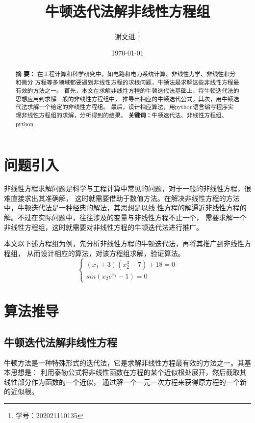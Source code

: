 \documentclass[UTF8,a4paper,12pt]{ctexart}
\title{\textbf{牛顿迭代法解非线性方程组}}
\author{ 谢文进 \thanks{学号：202021110135} }
\date{\today}
\begin{document}
    \maketitle
     	\maketitle %
     	\renewcommand{\abstractname}{}%
     	\begin{abstract}
     		\noindent %
     		{\bf 摘{} 要：}
			 {\small 在工程计算和科学研究中，如电路和电力系统计算、非线性力学、非线性积分和微分
			 方程等多领域都要遇到非线性方程的求根问题，牛顿法是求解这些非线性方程最有效的方法之一。
			 首先，本文在求解非线性方程的牛顿迭代法基础上，将牛顿迭代法的思想应用到求解一般的非线性方程组中，
			 推导出相应的牛顿迭代公式。其次，用牛顿迭代法求解一个给定的非线性方程组。
             最后，设计相应算法，用python语言编写程序实现非线性方程组的求解，分析得到的结果。}
             \newline %
             \textbf{关键词：}牛顿迭代法、非线性方程组、python
     	\end{abstract}



 \section{问题引入}
	非线性方程求解问题是科学与工程计算中常见的问题，对于一般的非线性方程，很难直接求出其准确解，
	这时就需要借助于数值方法。在解决非线性方程的方法中，牛顿迭代法是一种经典的解法，其思想是以线
	性方程的解逼近非线性方程的解。不过在实际问题中，往往涉及的变量与非线性方程不止一个，
	需要求解一个非线性方程组，这时就需要对非线性方程的牛顿迭代法进行推广。

	本文以下述方程组为例，先分析非线性方程的牛顿迭代法，再将其推广到非线性方程组，
	从而设计相应的算法，对该方程组求解，验证算法。
	\begin{equation}
		\begin{cases}({x}_1+3)({x}_2^3-7)+18=0\\sin({x}_2e^{{x}_1}-1)=0
		\end{cases}	
	\end{equation}
	




\section{算法推导} 
	\subsection{牛顿迭代法解非线性方程}
	牛顿方法是一种特殊形式的迭代法，它是求解非线性方程最有效的方法之一。其基本思想是：
	利用泰勒公式将非线性函数在方程的某个近似根处展开，然后截取其线性部分作为函数的一个近似，
	通过解一个一元一次方程来获得原方程的一个新的近似根。 
   
\end{document}
